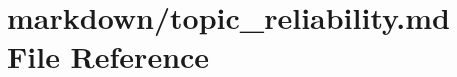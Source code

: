 \hypertarget{topic__reliability_8md}{}\section{markdown/topic\+\_\+reliability.md File Reference}
\label{topic__reliability_8md}
